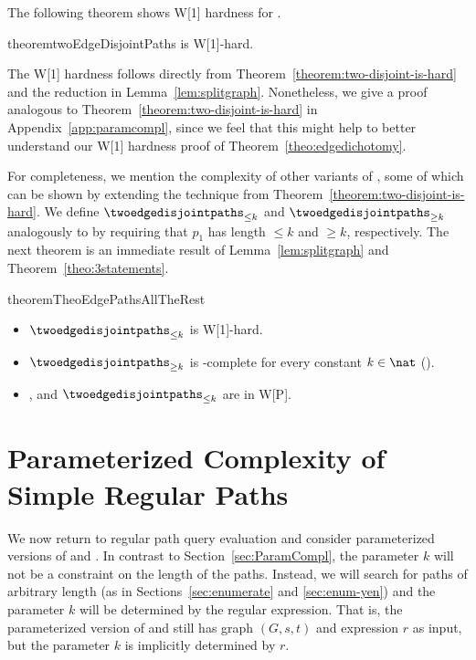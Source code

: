 \documentclass[a4paper,english]{lipics-v2016}
\theoremstyle{plain}
\begin{document}
The following theorem shows W[1] hardness for \kedgedisjointpaths. 
\begin{restatable}{theorem}{twoEdgeDisjointPaths}\label{theo:edgeTwodisjoint}
\kedgedisjointpaths is W[1]-hard.
\end{restatable}
The W[1] hardness follows directly from
Theorem~\ref{theorem:two-disjoint-is-hard} and the reduction in
Lemma~\ref{lem:splitgraph}. Nonetheless, we give a proof analogous to
Theorem~\ref{theorem:two-disjoint-is-hard} in
Appendix~\ref{app:paramcompl}, since we feel that this might help to better
understand our W[1] hardness proof of
Theorem~\ref{theo:edgedichotomy}. 

For completeness, we mention the complexity of other variants of
\kedgedisjointpaths, some of which can be shown by extending the technique
from Theorem~\ref{theorem:two-disjoint-is-hard}. We define $\twoedgedisjointpaths_{\leq k}$ and
$\twoedgedisjointpaths_{\geq k}$ analogously to \kedgedisjointpaths by
requiring that $p_1$ has length $\leq k$ and $\geq k$, respectively.
The next theorem is an immediate result of Lemma~\ref{lem:splitgraph} and Theorem~\ref{theo:3statements}.
\begin{restatable}{theorem}{TheoEdgePathsAllTheRest}
	\begin{itemize}
		\item   $\twoedgedisjointpaths_{\leq k}$ is W[1]-hard. 		\item   $\twoedgedisjointpaths_{\geq k}$ is \np-complete for every
		constant $k \in \nat$ (\cite{FortuneHW-TCS80}). 		\item \kedgedisjointpaths, and $\twoedgedisjointpaths_{\leq k}$ are in W[P]. 	\end{itemize}
\end{restatable}
 
\makeatletter{}\section{Parameterized Complexity of Simple Regular Paths}\label{sec:tractlanguages}\label{sec:param-srp}
We now return to regular path query evaluation and consider
parameterized versions of \nodespath and \edgespath. In contrast to
Section~\ref{sec:ParamCompl}, the parameter $k$ will not be a
constraint on the length of the paths. Instead, we will search for
paths of arbitrary length (as in Sections~\ref{sec:enumerate} and \ref{sec:enum-yen}) and the
parameter $k$ will be determined by the regular expression. That is,
the parameterized version of \nodespath and \edgespath still has graph $(G,s,t)$ and
expression $r$ as input, but the parameter $k$ is implicitly determined by
$r$.  
\end{document}
